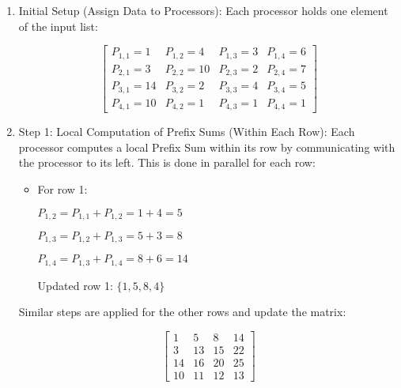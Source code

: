 \documentclass[a4paper,10pt]{article}
\begin{document}
    \begin{enumerate}
        
        \item Initial Setup (Assign Data to Processors): Each processor holds one element of the input list:

        \[
        \begin{bmatrix}
            
            P_{1,1}=1  & P_{1,2}=4  & P_{1,3}=3 & P_{1,4}=6 \\
            P_{2,1}=3  & P_{2,2}=10 & P_{2,3}=2 & P_{2,4}=7 \\
            P_{3,1}=14 & P_{3,2}=2  & P_{3,3}=4 & P_{3,4}=5 \\
            P_{4,1}=10 & P_{4,2}=1  & P_{4,3}=1 & P_{4,4}=1

        \end{bmatrix}
        \]

        \item Step 1: Local Computation of Prefix Sums (Within Each Row): Each processor computes a local Prefix Sum within its row by communicating with the processor to its left. This is done in parallel for each row:

        \begin{itemize}
            
            \item For row 1:
            
            $P_{1,2}=P_{1,1}+P_{1,2}=1+4=5$

            $P_{1,3}=P_{1,2}+P_{1,3}=5+3=8$
            
            $P_{1,4}=P_{1,3}+P_{1,4}=8+6=14$

            Updated row 1: $\{1, 5, 8, 4\}$

        \end{itemize}

        Similar steps are applied for the other rows and update the matrix:

        \[
            \begin{bmatrix}
                
                1  & 5  & 8  & 14 \\
                3  & 13 & 15 & 22 \\
                14 & 16 & 20 & 25 \\
                10 & 11 & 12 & 13
    
            \end{bmatrix}
        \]


\end{enumerate}
\end{document}
